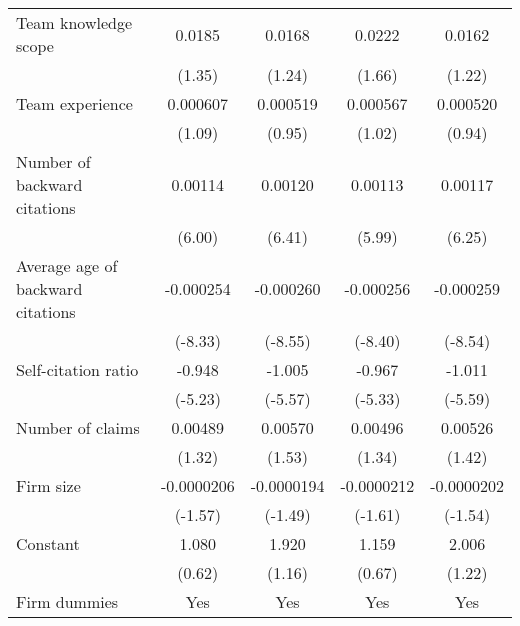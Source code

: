 \begin{table}[htbp]
{\begin{tabular}{l*{4}{c}}
\addlinespace
Team knowledge scope&      0.0185         &      0.0168         &      0.0222\sym{+}  &      0.0162         \\
                    &      (1.35)         &      (1.24)         &      (1.66)         &      (1.22)         \\
\addlinespace
Team experience     &    0.000607         &    0.000519         &    0.000567         &    0.000520         \\
                    &      (1.09)         &      (0.95)         &      (1.02)         &      (0.94)         \\
\addlinespace
Number of backward citations&     0.00114\sym{***}&     0.00120\sym{***}&     0.00113\sym{***}&     0.00117\sym{***}\\
                    &      (6.00)         &      (6.41)         &      (5.99)         &      (6.25)         \\
\addlinespace
Average age of backward citations&   -0.000254\sym{***}&   -0.000260\sym{***}&   -0.000256\sym{***}&   -0.000259\sym{***}\\
                    &     (-8.33)         &     (-8.55)         &     (-8.40)         &     (-8.54)         \\
\addlinespace
Self-citation ratio &      -0.948\sym{***}&      -1.005\sym{***}&      -0.967\sym{***}&      -1.011\sym{***}\\
                    &     (-5.23)         &     (-5.57)         &     (-5.33)         &     (-5.59)         \\
\addlinespace
Number of claims    &     0.00489         &     0.00570         &     0.00496         &     0.00526         \\
                    &      (1.32)         &      (1.53)         &      (1.34)         &      (1.42)         \\
\addlinespace
Firm size           &  -0.0000206         &  -0.0000194         &  -0.0000212         &  -0.0000202         \\
                    &     (-1.57)         &     (-1.49)         &     (-1.61)         &     (-1.54)         \\
\addlinespace
Constant            &       1.080         &       1.920         &       1.159         &       2.006         \\
                    &      (0.62)         &      (1.16)         &      (0.67)         &      (1.22)         \\
\addlinespace
Firm dummies&Yes&Yes&Yes&Yes\\

\end{tabular}}
\end{table}
